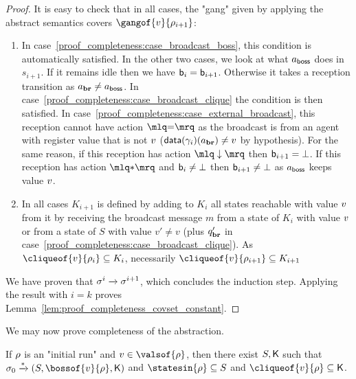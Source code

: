 \begin{proof}
	It is easy to check that in all cases, the "gang" given by applying the abstract semantics covers $\gangof{\aval}{\run_{i+1}}$:
	
	
	\begin{enumerate}[label = (\arabic*)]
		
		\item In case~\ref{proof_completeness:case_broadcast_boss}, this condition is automatically satisfied. In the other two cases, we look at what $a_{\mathsf{boss}}$ does in $s_{i+1}$. If it remains idle then we have $\mathsf{b}_i = \mathsf{b}_{i+1}$. Otherwise it takes a reception transition as $a_{\textbf{br}} \ne a_{\mathsf{boss}}$. In case~\ref{proof_completeness:case_broadcast_clique} the condition is then satisfied.
		In case~\ref{proof_completeness:case_external_broadcast}, this reception cannot have action $\quotemarks{\eqtestact}$ as the broadcast is from an agent with register value that is not $v$ ($\mathsf{data}(\gamma_i)(a_{\textbf{br}}) \ne v$ by hypothesis). For the same reason, if this reception has action $\quotemarks{\enregact}$ then $\mathsf{b}_{i+1}= \bot$. If this reception has action $\quotemarks{\dummyact}$ and $\mathsf{b}_i \ne \bot$ then $\mathsf{b}_{i+1} \ne \bot$ as $a_{\mathsf{boss}}$ keeps value $v$.
		
		\item In all cases $K_{i+1}$ is defined by adding to $K_i$ all states reachable with value $v$ from it by receiving the broadcast message $m$ from a state of $K_i$ with value $v$ or from a state of $S$ with value $v' \neq v$ (plus $q_{\textbf{br}}'$ in case~\ref{proof_completeness:case_broadcast_clique}). As $\cliqueof{\aval}{\run_i} \subseteq K_i$, necessarily  $\cliqueof{\aval}{\run_{i+1}} \subseteq K_{i+1}$
	\end{enumerate}
	
	We have proven that $\sigma^i \xrightarrow{} \sigma^{i+1}$, which concludes the induction step. Applying the result with $i = k$ proves Lemma~\ref{lem:proof_completeness_covset_constant}. 
\end{proof}

We may now prove completeness of the abstraction. 

\begin{lemma}
	\label{lem:abstraction_complete}
	If $\rho$ is an "initial run" and $\aval \in \valsof{\run}$, then there exist $S, \mathsf{K}$ such that $\aconfiginit \step{*} (S, \bossof{\aval}{\run}, \clique)$ and $\statesin{\run} \subseteq S$ and $\cliqueof{\aval}{\run} \subseteq \clique$. 
\end{lemma}

